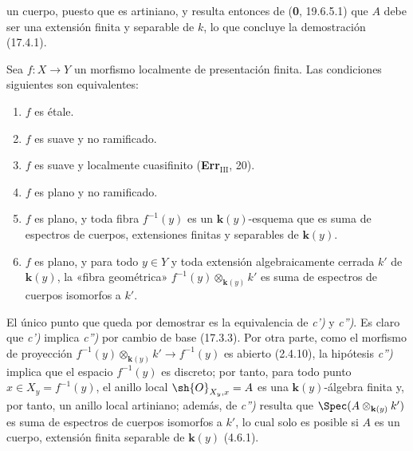 un cuerpo, puesto que es artiniano, y resulta entonces de (\textbf 0, 19.6.5.1) que $A$ debe ser una extensión finita y separable de $k$, lo que concluye la demostración (17.4.1).

\begin{corollary}[17.6.2]
\label{IV.17.6.2}
Sea $f:X\to Y$ un morfismo localmente de presentación finita. Las condiciones siguientes son equivalentes:
\begin{enumerate}
  \item[\textup{a)}] $f$ es étale.
  \item[\textup{a$'$)}] $f$ es suave y no ramificado.
  \item[\textup{b)}] $f$ es suave y localmente cuasifinito \textup{(\textbf{Err}$_{\mathrm{III}}$, 20)}.
  \item[\textup{c)}] $f$ es plano y no ramificado.
  \item[\textup{c$'$)}] $f$ es plano, y toda fibra $f^{-1}(y)$ es un $\boldsymbol{k}(y)$-esquema que es suma de espectros de cuerpos, extensiones finitas y separables de $\boldsymbol{k}(y)$.
  \item[\textup{c$''$)}] $f$ es plano, y para todo $y\in Y$ y toda extensión algebraicamente cerrada $k'$ de $\boldsymbol{k}(y)$, la «fibra geométrica» $f^{-1}(y)\otimes_{\mathbf{k}(y)}k'$ es suma de espectros de cuerpos isomorfos a $k'$.
\end{enumerate}
\end{corollary}

El único punto que queda por demostrar es la equivalencia de \emph{c')} y \emph{c'')}. Es claro que \emph{c')} implica \emph{c'')} por cambio de base (17.3.3). Por otra parte, como el morfismo de proyección $f^{-1}(y)\otimes_{\mathbf{k}(y)}k'\to f^{-1}(y)$ es abierto (2.4.10), la hipótesis \emph{c'')} implica que el espacio $f^{-1}(y)$ es discreto; por tanto, para todo punto $x\in X_y=f^{-1}(y)$, el anillo local $\sh{O}_{X_y,x}=A$ es una $\boldsymbol{k}(y)$-álgebra finita y, por tanto, un anillo local artiniano; además, de \emph{c'')} resulta que $\Spec(A\otimes_{\mathbf{k}(y)}k')$ es suma de espectros de cuerpos isomorfos a $k'$, lo cual solo es posible si $A$ es un cuerpo, extensión finita separable de $\boldsymbol{k}(y)$ (4.6.1).

